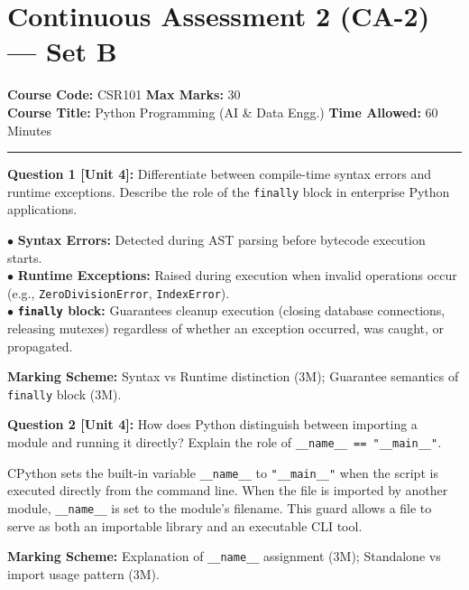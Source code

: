 \section{Continuous Assessment 2 (CA-2) --- Set B}
\noindent\textbf{Course Code:} CSR101 \hfill \textbf{Max Marks:} 30\\
\textbf{Course Title:} Python Programming (AI \& Data Engg.) \hfill \textbf{Time Allowed:} 60 Minutes\\
\vspace{4mm}
\hrule
\vspace{4mm}

\noindent\textbf{Question 1 [Unit 4]:} Differentiate between compile-time syntax errors and runtime exceptions. Describe the role of the \texttt{finally} block in enterprise Python applications.
\begin{solutionbox}
$\bullet$ \textbf{Syntax Errors:} Detected during AST parsing before bytecode execution starts.\\
$\bullet$ \textbf{Runtime Exceptions:} Raised during execution when invalid operations occur (e.g., \texttt{ZeroDivisionError}, \texttt{IndexError}).\\
$\bullet$ \textbf{\texttt{finally} block:} Guarantees cleanup execution (closing database connections, releasing mutexes) regardless of whether an exception occurred, was caught, or propagated.
\end{solutionbox}
\begin{markingrubric}
\textbf{Marking Scheme:} Syntax vs Runtime distinction (3M); Guarantee semantics of \texttt{finally} block (3M).
\end{markingrubric}

\noindent\textbf{Question 2 [Unit 4]:} How does Python distinguish between importing a module and running it directly? Explain the role of \texttt{\_\_name\_\_ == "\_\_main\_\_"}.
\begin{solutionbox}
CPython sets the built-in variable \texttt{\_\_name\_\_} to \texttt{"\_\_main\_\_"} when the script is executed directly from the command line. When the file is imported by another module, \texttt{\_\_name\_\_} is set to the module's filename. This guard allows a file to serve as both an importable library and an executable CLI tool.
\end{solutionbox}
\begin{markingrubric}
\textbf{Marking Scheme:} Explanation of \texttt{\_\_name\_\_} assignment (3M); Standalone vs import usage pattern (3M).
\end{markingrubric}

